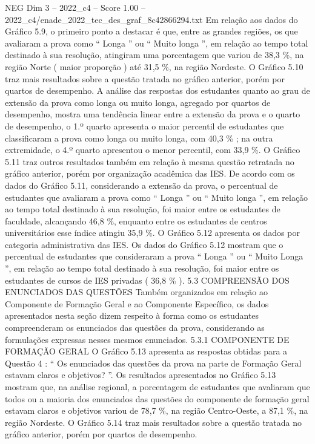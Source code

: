 \begin{textsample}{NEG Dim 3 – 2022\_c4 – Score 1.00 – 2022\_c4/enade\_2022\_tec\_des\_graf\_8c42866294.txt}
Em relação aos dados do Gráfico 5.9, o primeiro ponto a destacar é que, entre as grandes regiões, os que avaliaram a prova como “ Longa ” ou “ Muito longa ”, em relação ao tempo total destinado à sua resolução, atingiram uma porcentagem que variou de 38,3 \%, na região Norte ( maior proporção ) até 31,5 \%, na região Nordeste.
O Gráfico 5.10 traz mais resultados sobre a questão tratada no gráfico anterior, porém por quartos de desempenho.
A análise das respostas dos estudantes quanto ao grau de extensão da prova como longa ou muito longa, agregado por quartos de desempenho, mostra uma tendência linear entre a extensão da prova e o quarto de desempenho, o 1.º quarto apresenta o maior percentil de estudantes que classificaram a prova como longa ou muito longa, com 40,3 \% ; na outra extremidade, o 4.º quarto apresentou o menor percentil, com 33,9 \%.
O Gráfico 5.11 traz outros resultados também em relação à mesma questão retratada no gráfico anterior, porém por organização acadêmica das IES.
De acordo com os dados do Gráfico 5.11, considerando a extensão da prova, o percentual de estudantes que avaliaram a prova como “ Longa ” ou “ Muito longa ”, em relação ao tempo total destinado à sua resolução, foi maior entre os estudantes de faculdade, alcançando 46,8 \%, enquanto entre os estudantes de centros universitários esse índice atingiu 35,9 \%.
O Gráfico 5.12 apresenta os dados por categoria administrativa das IES.
Os dados do Gráfico 5.12 mostram que o percentual de estudantes que consideraram a prova “ Longa ” ou “ Muito Longa ”, em relação ao tempo total destinado à sua resolução, foi maior entre os estudantes de cursos de IES privadas ( 36,8 \% ). 5.3 COMPREENSÃO DOS ENUNCIADOS DAS QUESTÕES Também organizados em relação ao Componente de Formação Geral e ao Componente Específico, os dados apresentados nesta seção dizem respeito à forma como os estudantes compreenderam os enunciados das questões da prova, considerando as formulações expressas nesses mesmos enunciados. 5.3.1 COMPONENTE DE FORMAÇÃO GERAL O Gráfico 5.13 apresenta as respostas obtidas para a Questão 4 : “ Os enunciados das questões da prova na parte de Formação Geral estavam claros e objetivos? ”.
Os resultados apresentados no Gráfico 5.13 mostram que, na análise regional, a porcentagem de estudantes que avaliaram que todos ou a maioria dos enunciados das questões do componente de formação geral estavam claros e objetivos variou de 78,7 \%, na região Centro-Oeste, a 87,1 \%, na região Nordeste.
O Gráfico 5.14 traz mais resultados sobre a questão tratada no gráfico anterior, porém por quartos de desempenho.

\end{textsample}
